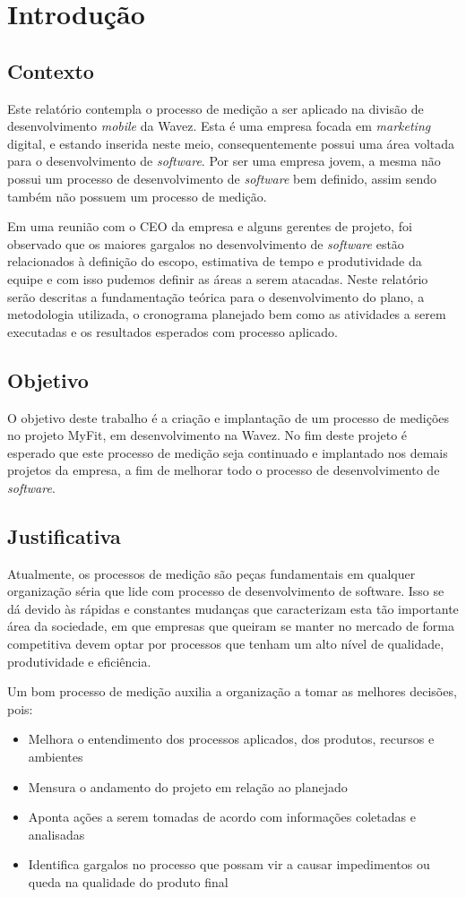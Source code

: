 \chapter{Introdução}
\section{Contexto}
Este relatório contempla o processo de medição a ser aplicado na divisão de desenvolvimento \textit{mobile} da Wavez. Esta é uma empresa focada em \textit{marketing} digital, e estando inserida neste meio, consequentemente possui uma área voltada para o desenvolvimento de \textit{software}. Por ser uma empresa jovem, a mesma não possui um processo de desenvolvimento de \textit{software} bem definido, assim sendo também não possuem um processo de medição.

Em uma reunião com o CEO da empresa e alguns gerentes de projeto, foi observado que os maiores gargalos no desenvolvimento de \textit{software} estão relacionados à definição do escopo, estimativa de tempo e produtividade da equipe e com isso pudemos definir as áreas a serem atacadas. Neste relatório serão descritas a fundamentação teórica para o desenvolvimento do plano, a metodologia utilizada, o cronograma planejado bem como as atividades a serem executadas e os resultados esperados com processo aplicado.
\section{Objetivo}
O objetivo deste trabalho é a criação e implantação de um processo de medições no projeto MyFit, em desenvolvimento na Wavez. No fim deste projeto é esperado que este processo de medição seja continuado e implantado nos demais projetos da empresa, a fim de melhorar todo o processo de desenvolvimento de \textit{software}.
\section{Justificativa}
Atualmente, os processos de medição são peças fundamentais em qualquer organização séria que lide com processo de desenvolvimento de software. Isso se dá devido às rápidas e constantes mudanças que caracterizam esta tão importante área da sociedade, em que empresas que queiram se manter no mercado de forma competitiva devem optar por processos que tenham um alto nível de qualidade, produtividade e eficiência.

Um bom processo de medição auxilia a organização a tomar as melhores decisões, pois:
\begin{itemize}
\item Melhora o entendimento dos processos aplicados, dos produtos, recursos e ambientes
\item Mensura o andamento do projeto em relação ao planejado
\item Aponta ações a serem tomadas de acordo com informações coletadas e analisadas
\item Identifica gargalos no processo que possam vir a causar impedimentos ou queda na qualidade do produto final
\end{itemize}
